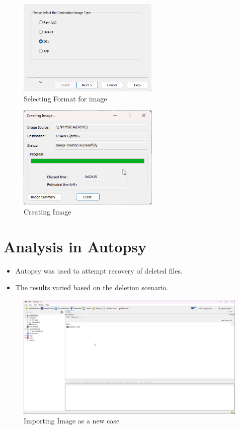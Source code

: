\documentclass[11pt]{article}
\begin{document}
\begin{figure}[H]
    \centering
    \includegraphics[width=0.6\textwidth]{imaging_6.png}
    \caption{Selecting Format for image}
    \label{fig:1}
\end{figure}

\begin{figure}[H]
    \centering
    \includegraphics[width=0.6\textwidth]{imaging_10.png}
    \caption{Creating Image}
    \label{fig:1}
\end{figure}


\section{Analysis in Autopsy}

\begin{itemize}
    \item Autopsy was used to attempt recovery of deleted files.
    \item The results varied based on the deletion scenario.
\end{itemize}
\begin{figure}[H]
    \centering
    \includegraphics[width=0.99\textwidth]{autopsy_08.png}
    \caption{Importing Image as a new case}
    \label{fig:1}
\end{figure}
\end{document}
